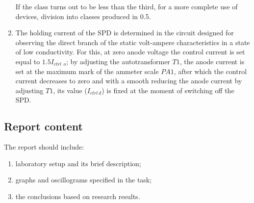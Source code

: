 \documentclass[a4paper,14pt]{article}
\begin{document}
\begin{enumerate}
If the class turns out to be less than the third, for a more complete use of devices, division into classes
produced in 0.5.


\item The holding current of the SPD is determined in the circuit designed for observing the direct 
branch of the static volt-ampere
characteristics in a state of low conductivity. For this, at zero anode voltage
the control current is set equal to $1.5 I_{ctrl\:\:o}$; by adjusting the autotransformer $T1$, 
the anode current is set
at the maximum mark of the ammeter scale $PA1$, after which the control current decreases to zero and with a smooth
reducing the anode current by adjusting $T1$, its value ($I_{ctrl\: d}$) is fixed at the moment 
of switching off the SPD.
\end{enumerate}

\subsection{Report content}

The report should include:
\begin{enumerate}
\item laboratory setup and its brief description;
\item graphs and oscillograms specified in the task;
\item the conclusions based on research results.
\end{enumerate}
\end{document}
